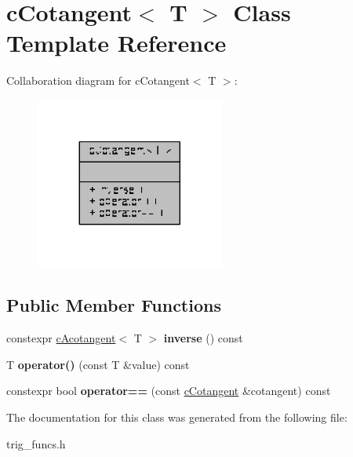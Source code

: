 \hypertarget{classcCotangent}{\section{c\-Cotangent$<$ T $>$ Class Template Reference}
\label{classcCotangent}
}


Collaboration diagram for c\-Cotangent$<$ T $>$\-:
\nopagebreak
\begin{figure}[H]
\begin{center}
\leavevmode
\includegraphics[width=176pt]{classcCotangent__coll__graph}
\end{center}
\end{figure}
\subsection*{Public Member Functions}
\begin{DoxyCompactItemize}
\item 
\hypertarget{classcCotangent_a681f4135e01e5df6ed2fddbc8d54816c}{constexpr \hyperlink{classcAcotangent}{c\-Acotangent}$<$ T $>$ {\bfseries inverse} () const }\label{classcCotangent_a681f4135e01e5df6ed2fddbc8d54816c}

\item 
\hypertarget{classcCotangent_aca0f0803677fe3a3cc6833907f489e8c}{T {\bfseries operator()} (const T \&value) const }\label{classcCotangent_aca0f0803677fe3a3cc6833907f489e8c}

\item 
\hypertarget{classcCotangent_a9af21db85cdad1fb39e8184da7c450c7}{constexpr bool {\bfseries operator==} (const \hyperlink{classcCotangent}{c\-Cotangent} \&cotangent) const }\label{classcCotangent_a9af21db85cdad1fb39e8184da7c450c7}

\end{DoxyCompactItemize}


The documentation for this class was generated from the following file\-:\begin{DoxyCompactItemize}
\item 
trig\-\_\-funcs.\-h\end{DoxyCompactItemize}
